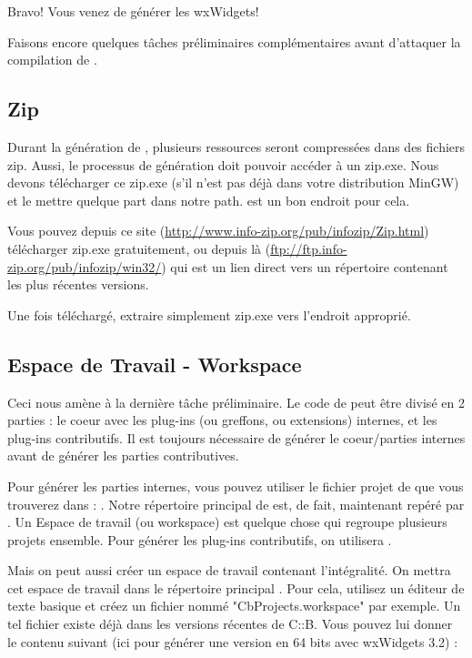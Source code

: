 Bravo! Vous venez de générer les wxWidgets!

Faisons encore quelques tâches préliminaires complémentaires avant d'attaquer la compilation de \codeblocks.

\subsection{Zip}

Durant la génération de \codeblocks, plusieurs ressources seront compressées dans des fichiers zip. Aussi, le processus de génération doit pouvoir accéder à un zip.exe. Nous devons télécharger ce zip.exe (s'il n'est pas déjà dans votre distribution MinGW) et le mettre quelque part dans notre path.  est un bon endroit pour cela.

Vous pouvez depuis ce site (\url{http://www.info-zip.org/pub/infozip/Zip.html}) télécharger zip.exe gratuitement, ou depuis là (\url{ftp://ftp.info-zip.org/pub/infozip/win32/}) qui est un lien direct vers un répertoire contenant les plus récentes versions.

Une fois téléchargé, extraire simplement zip.exe vers l'endroit approprié.

\subsection{Espace de Travail - Workspace}
Ceci nous amène à la dernière tâche préliminaire. Le code de \codeblocks peut être divisé en 2 parties : le coeur avec les plug-ins (ou greffons, ou extensions) internes, et les plug-ins contributifs. Il est toujours nécessaire de générer le coeur/parties internes avant de générer les parties contributives.

Pour générer les parties internes, vous pouvez utiliser le fichier projet de \codeblocks que vous trouverez dans : . Notre répertoire principal de \codeblocks est, de fait, maintenant repéré par . Un Espace de travail (ou workspace) est quelque chose qui regroupe plusieurs projets ensemble. Pour générer les plug-ins contributifs, on utilisera .

Mais on peut aussi créer un espace de travail contenant l'intégralité. On mettra cet espace de travail dans le répertoire principal . Pour cela, utilisez un éditeur de texte basique et créez un fichier nommé "CbProjects.workspace" par exemple. Un tel fichier existe déjà dans les versions récentes de C::B. Vous pouvez lui donner le contenu suivant (ici pour générer une version en 64 bits avec wxWidgets 3.2) : 

